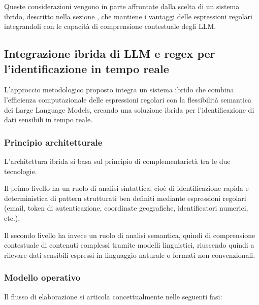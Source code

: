 \documentclass[12pt]{report}
\begin{document}
Queste considerazioni vengono in parte affrontate dalla scelta di un sistema ibrido, descritto nella sezione , che mantiene i vantaggi delle espressioni regolari integrandoli con le capacità di comprensione contestuale degli LLM.

\subsection{Integrazione ibrida di LLM e regex per l'identificazione in tempo reale}
\label{subsec:ibrido_llm_regex}

L'approccio metodologico proposto integra un sistema ibrido che combina l'efficienza computazionale delle espressioni regolari con la flessibilità semantica dei Large Language Models, creando una soluzione ibrida per l'identificazione di dati sensibili in tempo reale.

\subsubsection{Principio architetturale}

L'architettura ibrida si basa sul principio di complementarietà tra le due tecnologie.

Il primo livello ha un ruolo di analisi sintattica, cioè di identificazione rapida e deterministica di pattern strutturati ben definiti mediante espressioni regolari (email, token di autenticazione, coordinate geografiche, identificatori numerici, etc.).

Il secondo livello ha invece un ruolo di analisi semantica, quindi di comprensione contestuale di contenuti complessi tramite modelli linguistici, riuscendo quindi a rilevare dati sensibili espressi in linguaggio naturale o formati non convenzionali.

\subsubsection{Modello operativo}

Il flusso di elaborazione si articola concettualmente nelle seguenti fasi:
\end{document}
